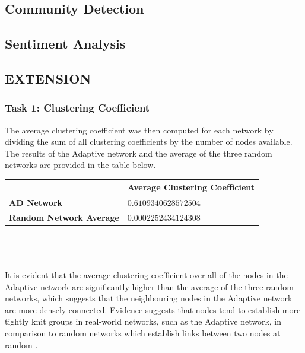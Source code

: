 \documentclass[conference]{IEEEtran}
\begin{document}
	\subsection{Community Detection}
	
	\subsection{Sentiment Analysis}
	
	\subsection{EXTENSION}
		\subsubsection{Task 1: Clustering Coefficient}
			{
				The average clustering coefficient was then computed for each network by dividing the sum of all clustering coefficients by the number of nodes available. The results of the Adaptive network and the average of the three random networks are provided in the table below. \\
				
				\begin{tabularx}{0.95\linewidth}{| X | X |}
					\hline
					\, & \textbf{Average Clustering Coefficient} \\ \hline
					\textbf{AD Network} & $0.6109340628572504$ \\ \hline
					\textbf{Random Network Average} & $0.0002252434124308$ \\ \hline
				\end{tabularx} 
				\\ \\ \\
				It is evident that the average clustering coefficient over all of the nodes in the Adaptive network are significantly higher than the average of the three random networks, which suggests that the neighbouring nodes in the Adaptive network are more densely connected.  Evidence suggests that nodes tend to establish more tightly knit groups in real-world networks, such as the Adaptive network, in comparison to random networks which establish links between two nodes at random \cite{hollandleinhardt}.
			\par}
			
\end{document}
